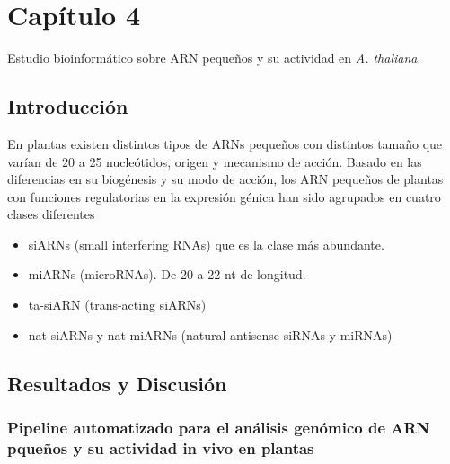 
\graphicspath{{Chapter4/Figs/}}

\setcounter{chapter}{7}
\chapter*{Capítulo 4} 
\setcounter{figure}{0}
\setcounter{section}{0}

{\LARGE Estudio bioinformático sobre ARN pequeños y su actividad en \textit{A. thaliana}.}

\section{Introducción}

En plantas existen distintos tipos de ARNs pequeños con distintos tamaño que varían de 20 a 25 nucleótidos, origen y mecanismo de acción.
Basado en las diferencias en su biogénesis y su modo de acción, los ARN pequeños de plantas con funciones regulatorias en la expresión génica han sido agrupados en cuatro clases diferentes
\begin{itemize}
	\item siARNs 	(small interfering RNAs) que es la clase más abundante. 
	\item miARNs (microRNAs). De 20 a 22 nt de longitud.
	\item ta-siARN (trans-acting siARNs)
	\item nat-siARNs y nat-miARNs (natural antisense siRNAs y miRNAs)
\end{itemize}

\section{Resultados y Discusión}

\subsection{Pipeline automatizado para el análisis genómico de ARN pqueños y su actividad in vivo en plantas}

